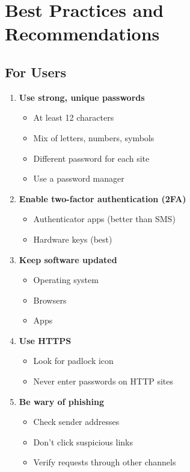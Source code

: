 \documentclass[11pt,a4paper]{report}
\begin{document}
\newpage
\chapter{Best Practices and Recommendations}

\section{For Users}

\begin{enumerate}
\item \textbf{Use strong, unique passwords}
   \begin{itemize}
   \item At least 12 characters
   \item Mix of letters, numbers, symbols
   \item Different password for each site
   \item Use a password manager
   \end{itemize}

\item \textbf{Enable two-factor authentication (2FA)}
   \begin{itemize}
   \item Authenticator apps (better than SMS)
   \item Hardware keys (best)
   \end{itemize}

\item \textbf{Keep software updated}
   \begin{itemize}
   \item Operating system
   \item Browsers
   \item Apps
   \end{itemize}

\item \textbf{Use HTTPS}
   \begin{itemize}
   \item Look for padlock icon
   \item Never enter passwords on HTTP sites
   \end{itemize}

\item \textbf{Be wary of phishing}
   \begin{itemize}
   \item Check sender addresses
   \item Don't click suspicious links
   \item Verify requests through other channels
   \end{itemize}


\end{enumerate}
\end{document}

